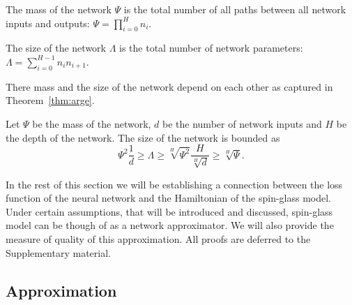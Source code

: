 \documentclass[twoside]{article}
\begin{document}
\begin{definition}
The mass of the network $\Psi$ is the total number of all paths between all network inputs and outputs: $\Psi = \prod_{i=0}^Hn_i$.
\end{definition}

\begin{definition}
The size of the network $\Lambda$ is the total number of network parameters: $\Lambda = \sum_{i=0}^{H-1}n_in_{i+1}$.
\end{definition}

There mass and the size of the network depend on each other as captured in Theorem~\ref{thm:arge}.
\begin{theorem}
Let $\Psi$ be the mass of the network, $d$ be the number of network inputs and $H$ be the depth of the network. The size of the network is bounded as
\[\Psi^2\frac{1}{d} \geq \Lambda \geq \sqrt[H]{\Psi^2}\frac{H}{\sqrt[H]{d}} \geq \sqrt[H]{\Psi}.
\]
\label{thm:arge}
\end{theorem}

In the rest of this section we will be establishing a connection between the loss function of the neural network and the Hamiltonian of the spin-glass model. Under certain assumptions, that will be introduced and discussed, spin-glass model can be though of as a network approximator. We will also provide the measure of quality of this approximation. All proofs are deferred to the Supplementary material.

\subsection{Approximation}
\end{document}

